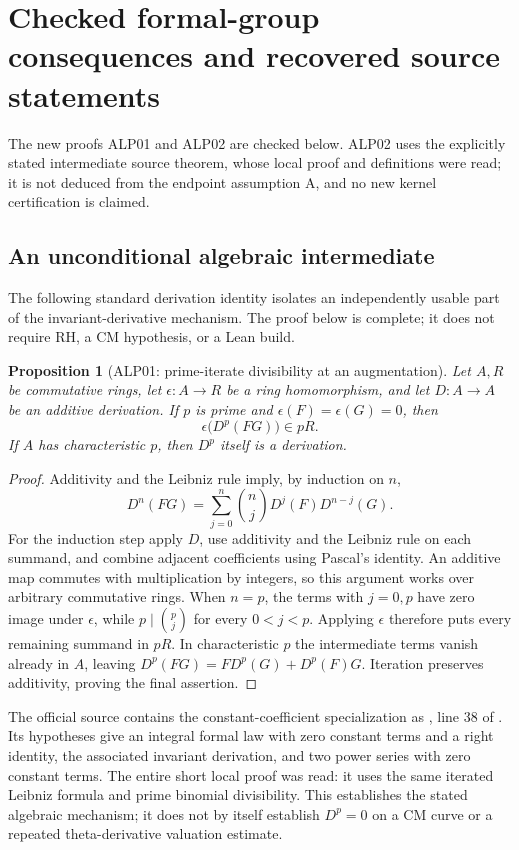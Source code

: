 \documentclass[11pt,a4paper]{article}
\newtheorem{proposition}[theorem]{Proposition}
\theoremstyle{definition}
\begin{document}
\section{Checked formal-group consequences and recovered source statements}
The new proofs ALP01 and ALP02 are checked below. ALP02 uses the explicitly stated intermediate source theorem, whose local proof and definitions were read; it is not deduced from the endpoint assumption A, and no new kernel certification is claimed.

\subsection{An unconditional algebraic intermediate}

The following standard derivation identity isolates an independently usable
part of the invariant-derivative mechanism.  The proof below is complete;
it does not require RH, a CM hypothesis, or a Lean build.

\begin{proposition}[ALP01: prime-iterate divisibility at an augmentation]
Let \(A,R\) be commutative rings, let \(\epsilon:A\to R\) be a ring
homomorphism, and let \(D:A\to A\) be an additive derivation.  If \(p\)
is prime and \(\epsilon(F)=\epsilon(G)=0\), then
\[
 \epsilon\bigl(D^p(FG)\bigr)\in pR.
\]
If \(A\) has characteristic \(p\), then \(D^p\) itself is a derivation.
\end{proposition}

\begin{proof}
Additivity and the Leibniz rule imply, by induction on \(n\),
\[
 D^n(FG)=\sum_{j=0}^{n}\binom nj D^j(F)D^{n-j}(G).
\]
For the induction step apply \(D\), use additivity and the Leibniz rule on
each summand, and combine adjacent coefficients using Pascal's identity.
An additive map commutes with multiplication by integers, so this argument
works over arbitrary commutative rings.  When \(n=p\), the terms with
\(j=0,p\) have zero image under \(\epsilon\), while
\(p\mid\binom pj\) for every \(0<j<p\).  Applying \(\epsilon\)
therefore puts every remaining summand in \(pR\).  In characteristic
\(p\) the intermediate terms vanish already in \(A\), leaving
\(D^p(FG)=F D^p(G)+D^p(F)G\).  Iteration preserves additivity, proving
the final assertion.
\end{proof}

The official source contains the constant-coefficient specialization as
, line 38
of
.
Its hypotheses give an integral formal law with zero constant terms and a
right identity, the associated invariant derivation, and two power series
with zero constant terms.  The entire short local proof was read: it uses
the same iterated Leibniz formula and prime binomial divisibility.  This
establishes the stated algebraic mechanism; it does not by itself establish
\(D^p=0\) on a CM curve or a repeated theta-derivative valuation estimate.
\end{document}
